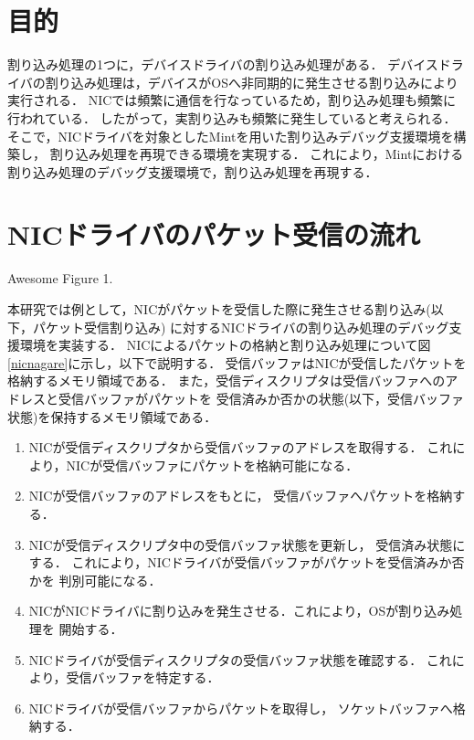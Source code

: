 \documentclass[tanilab-enum]{graduate}
\begin{document}
\section{目的}
割り込み処理の1つに，デバイスドライバの割り込み処理がある．
デバイスドライバの割り込み処理は，デバイスがOSへ非同期的に発生させる割り込みにより
実行される．
NICでは頻繁に通信を行なっているため，割り込み処理も頻繁に行われている．
したがって，実割り込みも頻繁に発生していると考えられる．
そこで，NICドライバを対象としたMintを用いた割り込みデバッグ支援環境を構築し，
割り込み処理を再現できる環境を実現する．
これにより，Mintにおける割り込み処理のデバッグ支援環境で，割り込み処理を再現する．
\section{NICドライバのパケット受信の流れ}
{Awesome Figure 1.}

本研究では例として，NICがパケットを受信した際に発生させる割り込み(以下，パケット受信割り込み)
に対するNICドライバの割り込み処理のデバッグ支援環境を実装する．
NICによるパケットの格納と割り込み処理について図\ref{nicnagare}に示し，以下で説明する．
受信バッファはNICが受信したパケットを格納するメモリ領域である．
また，受信ディスクリプタは受信バッファへのアドレスと受信バッファがパケットを
受信済みか否かの状態(以下，受信バッファ状態)を保持するメモリ領域である．
\begin{enumerate}
    \item 
        NICが受信ディスクリプタから受信バッファのアドレスを取得する．
        これにより，NICが受信バッファにパケットを格納可能になる．
    \item 
        NICが受信バッファのアドレスをもとに，
        受信バッファへパケットを格納する．
    \item 
        NICが受信ディスクリプタ中の受信バッファ状態を更新し，
        受信済み状態にする．
        これにより，NICドライバが受信バッファがパケットを受信済みか否かを
        判別可能になる．
    \item 
        NICがNICドライバに割り込みを発生させる．これにより，OSが割り込み処理を
        開始する．
    \item 
        NICドライバが受信ディスクリプタの受信バッファ状態を確認する．
        これにより，受信バッファを特定する．
    \item 
        NICドライバが受信バッファからパケットを取得し，
        ソケットバッファへ格納する．
\end{enumerate}
\end{document}
